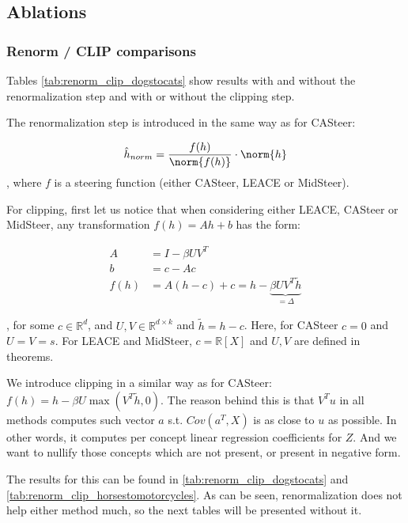 


\subsection{Ablations}




\subsubsection{Renorm / CLIP comparisons}

Tables \ref{tab:renorm_clip_dogstocats} show results with and without the renormalization step and with or without the clipping step.

The renormalization step is introduced in the same way as for CASteer:

\begin{align*}
    \hat{h}_{norm} = \frac{f(h)}{\norm{f(h)}} \cdot \norm{h}    
\end{align*}
, where $f$ is a steering function (either CASteer, LEACE or MidSteer).


For clipping, first let us notice that when considering either LEACE, CASteer or MidSteer, any transformation $f(h) = Ah + b$ has the form:

\begin{align*}
    A &= I - \beta U V^T \\
    b &= c - Ac \\
    f(h) &= A (h-c) + c = h - \underbrace{\beta UV^T \tilde{h}}_{=\Delta}
\end{align*}

, for some $c \in \mathbb{R}^d$, and $U, V \in \mathbb{R}^{d \times k}$ and $\tilde{h} = h - c$. Here, for CASteer $c=0$ and $U = V = s$. For LEACE and MidSteer, $c=\mathbb{R}[X]$ and $U, V$ are defined in theorems.

We introduce clipping in a similar way as for CASteer: $f(h) = h - \beta U \max(V^T \tilde{h}, 0)$. The reason behind this is that $V^T u$ in all methods computes such vector $a$ s.t. $Cov(a^T, X)$ is as close to $u$ as possible. In other words, it computes per concept linear regression coefficients for $Z$. And we want to nullify those concepts which are not present, or present in negative form.

The results for this can be found in \ref{tab:renorm_clip_dogstocats} and \ref{tab:renorm_clip_horsestomotorcycles}. As can be seen, renormalization does not help either method much, so the next tables will be presented without it.



